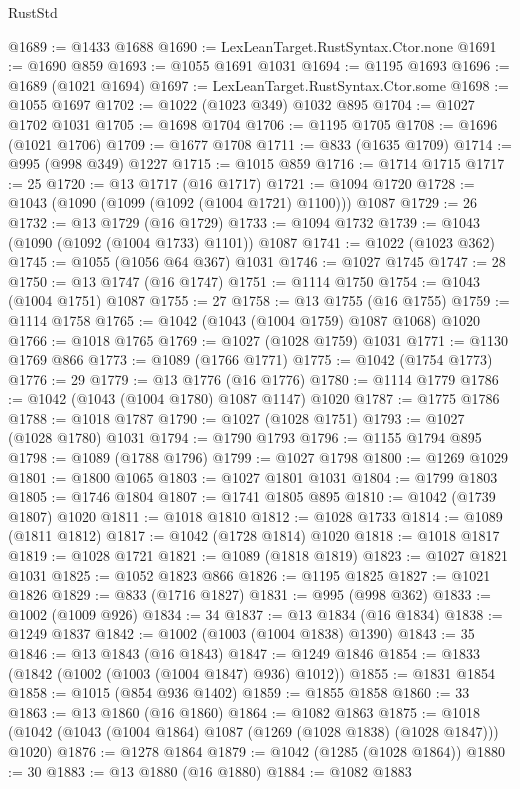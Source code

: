 \begin{lexlean}{RustStd}
\begin{coremodule}
@1689 := @1433 @1688
@1690 := LexLeanTarget.RustSyntax.Ctor.none
@1691 := @1690 @859
@1693 := @1055 @1691 @1031
@1694 := @1195 @1693
@1696 := @1689 (@1021 @1694)
@1697 := LexLeanTarget.RustSyntax.Ctor.some
@1698 := @1055 @1697
@1702 := @1022 (@1023 @349) @1032 @895
@1704 := @1027 @1702 @1031
@1705 := @1698 @1704
@1706 := @1195 @1705
@1708 := @1696 (@1021 @1706)
@1709 := @1677 @1708
@1711 := @833 (@1635 @1709)
@1714 := @995 (@998 @349) @1227
@1715 := @1015 @859
@1716 := @1714 @1715
@1717 := 25
@1720 := @13 @1717 (@16 @1717)
@1721 := @1094 @1720
@1728 := @1043 (@1090 (@1099 (@1092 (@1004 @1721) @1100))) @1087
@1729 := 26
@1732 := @13 @1729 (@16 @1729)
@1733 := @1094 @1732
@1739 := @1043 (@1090 (@1092 (@1004 @1733) @1101)) @1087
@1741 := @1022 (@1023 @362)
@1745 := @1055 (@1056 @64 @367) @1031
@1746 := @1027 @1745
@1747 := 28
@1750 := @13 @1747 (@16 @1747)
@1751 := @1114 @1750
@1754 := @1043 (@1004 @1751) @1087
@1755 := 27
@1758 := @13 @1755 (@16 @1755)
@1759 := @1114 @1758
@1765 := @1042 (@1043 (@1004 @1759) @1087 @1068) @1020
@1766 := @1018 @1765
@1769 := @1027 (@1028 @1759) @1031
@1771 := @1130 @1769 @866
@1773 := @1089 (@1766 @1771)
@1775 := @1042 (@1754 @1773)
@1776 := 29
@1779 := @13 @1776 (@16 @1776)
@1780 := @1114 @1779
@1786 := @1042 (@1043 (@1004 @1780) @1087 @1147) @1020
@1787 := @1775 @1786
@1788 := @1018 @1787
@1790 := @1027 (@1028 @1751)
@1793 := @1027 (@1028 @1780) @1031
@1794 := @1790 @1793
@1796 := @1155 @1794 @895
@1798 := @1089 (@1788 @1796)
@1799 := @1027 @1798
@1800 := @1269 @1029
@1801 := @1800 @1065
@1803 := @1027 @1801 @1031
@1804 := @1799 @1803
@1805 := @1746 @1804
@1807 := @1741 @1805 @895
@1810 := @1042 (@1739 @1807) @1020
@1811 := @1018 @1810
@1812 := @1028 @1733
@1814 := @1089 (@1811 @1812)
@1817 := @1042 (@1728 @1814) @1020
@1818 := @1018 @1817
@1819 := @1028 @1721
@1821 := @1089 (@1818 @1819)
@1823 := @1027 @1821 @1031
@1825 := @1052 @1823 @866
@1826 := @1195 @1825
@1827 := @1021 @1826
@1829 := @833 (@1716 @1827)
@1831 := @995 (@998 @362)
@1833 := @1002 (@1009 @926)
@1834 := 34
@1837 := @13 @1834 (@16 @1834)
@1838 := @1249 @1837
@1842 := @1002 (@1003 (@1004 @1838) @1390)
@1843 := 35
@1846 := @13 @1843 (@16 @1843)
@1847 := @1249 @1846
@1854 := @1833 (@1842 (@1002 (@1003 (@1004 @1847) @936) @1012))
@1855 := @1831 @1854
@1858 := @1015 (@854 @936 @1402)
@1859 := @1855 @1858
@1860 := 33
@1863 := @13 @1860 (@16 @1860)
@1864 := @1082 @1863
@1875 := @1018 (@1042 (@1043 (@1004 @1864) @1087 (@1269 (@1028 @1838) (@1028 @1847))) @1020)
@1876 := @1278 @1864
@1879 := @1042 (@1285 (@1028 @1864))
@1880 := 30
@1883 := @13 @1880 (@16 @1880)
@1884 := @1082 @1883

\end{coremodule}
\end{lexlean}
